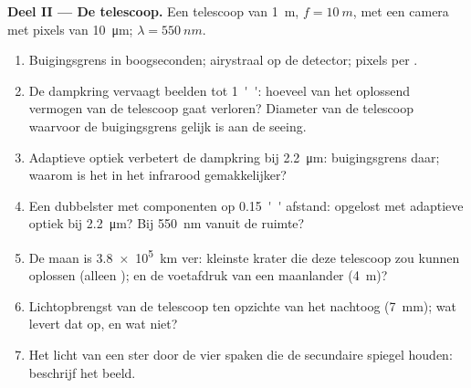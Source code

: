 \begin{problem}
\medskip
\noindent\textbf{Deel II --- De telescoop.}
Een telescoop van \qty{1}{m}, $f = \qty{10}{m}$, met een camera met pixels
van \qty{10}{\micro m};
$\lambda = \qty{550}{nm}$.
\begin{enumerate}[resume]
  \item Buigingsgrens in boogseconden; airystraal op de
        detector; pixels per .
  \item De dampkring vervaagt beelden tot \qty{1}{''}: hoeveel van het
        oplossend vermogen van de telescoop gaat verloren? Diameter van de
        telescoop waarvoor
        de buigingsgrens gelijk is aan de seeing.
  \item Adaptieve optiek verbetert de dampkring bij \qty{2.2}{\micro m}:
        buigingsgrens daar; waarom is het in het infrarood gemakkelijker?
  \item Een dubbelster met componenten op \qty{0.15}{''} afstand: opgelost met
        adaptieve optiek bij \qty{2.2}{\micro m}? Bij \qty{550}{nm} vanuit
        de ruimte?
  \item De maan is \qty{3.8e5}{km} ver: kleinste krater die deze telescoop
        zou kunnen oplossen (alleen ); en de voetafdruk van een maanlander
        (\qty{4}{m})?
  \item Lichtopbrengst van de telescoop ten opzichte van het
        nachtoog (\qty{7}{mm}); wat levert dat op, en wat niet?
  \item Het licht van een ster door de vier spaken die de
        secundaire spiegel houden: beschrijf het beeld.
\end{enumerate}


\end{problem}
